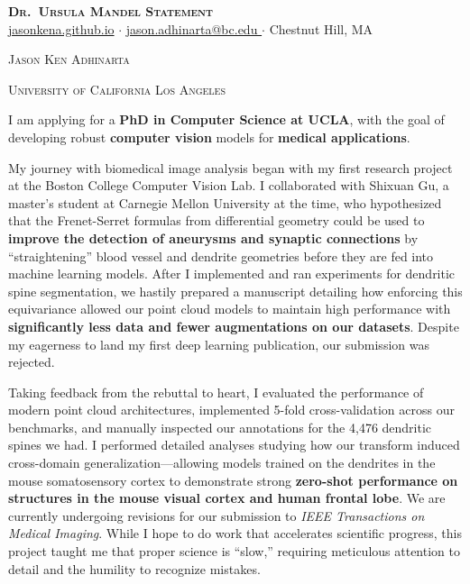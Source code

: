 \documentclass[letterpaper,11pt]{article}
\newcommand{\dualsectionold}[2]{%
  \noindent
    \parbox[b]{0.5\textwidth}{\raggedright\scshape\large #1}%
    \hfill
    \parbox[b]{0.5\textwidth}{\raggedleft\scshape\large #2}%
}
\newcommand{\dualsectionhline}{%
  \vspace{2pt}\color{black}\titlerule\vspace{-5pt}
}
\newcommand{\dualsection}[2]{%
  \dualsectionold{#1}{#2}%
  \vspace{-5pt}\dualsectionhline
}
\begin{document}
\justifying

\begin{center}
  \textbf{\Huge \scshape Dr.\ Ursula Mandel Statement} \\ \vspace{3pt}
    \small
    \href{https://jasonkena.github.io}{jasonkena.github.io}
   \hspace{0.05cm}$\cdot$\hspace{0.05cm}
    \href{mailto:jason.adhinarta@bc.edu}{ jason.adhinarta@bc.edu }
   \hspace{0.05cm}$\cdot$\hspace{0.05cm}
    Chestnut Hill, MA
\end{center}


\dualsection{Jason Ken Adhinarta}{University of California Los Angeles}
\vspace{2pt}\color{black}\titlerule%


I am applying for a \textbf{PhD in Computer Science at UCLA}, with the goal of developing robust \textbf{computer vision} models for \textbf{medical applications}.

My journey with biomedical image analysis began with my first research project at the Boston College Computer Vision Lab. I collaborated with Shixuan Gu, a master’s student at Carnegie Mellon University at the time, who hypothesized that the Frenet-Serret formulas from differential geometry could be used to \textbf{improve the detection of aneurysms and synaptic connections} by “straightening” blood vessel and dendrite geometries before they are fed into machine learning models. After I implemented and ran experiments for dendritic spine segmentation, we hastily prepared a manuscript detailing how enforcing this equivariance allowed our point cloud models to maintain high performance with \textbf{significantly less data and fewer augmentations on our datasets}. Despite my eagerness to land my first deep learning publication, our submission was rejected.

Taking feedback from the rebuttal to heart, I evaluated the performance of modern point cloud architectures, implemented 5-fold cross-validation across our benchmarks, and manually inspected our annotations for the 4,476 dendritic spines we had. I performed detailed analyses studying how our transform induced cross-domain generalization—allowing models trained on the dendrites in the mouse somatosensory cortex to demonstrate strong \textbf{zero-shot performance on structures in the mouse visual cortex and human frontal lobe}. We are currently undergoing revisions for our submission to \textit{IEEE Transactions on Medical Imaging}. While I hope to do work that accelerates scientific progress, this project taught me that proper science is “slow,” requiring meticulous attention to detail and the humility to recognize mistakes.
\end{document}
